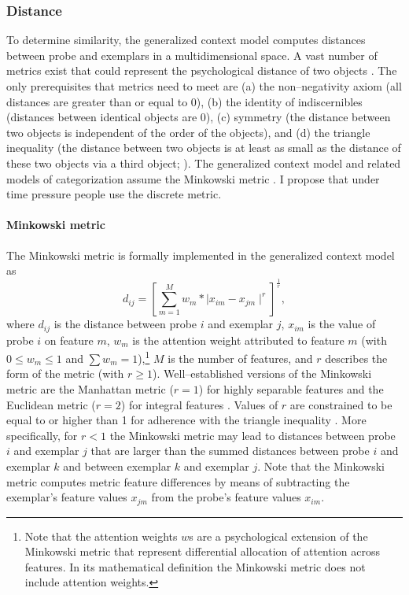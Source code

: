 \documentclass[a4paper,man,natbib]{apa6}
\begin{document}
\subsubsection{Distance}
To determine similarity, the generalized context model computes distances between probe and exemplars in a multidimensional space. A vast number of metrics exist that could represent the psychological distance of two objects \citep{deza2009encyclopedia}. The only prerequisites that metrics need to meet are (a) the non--negativity axiom (all distances are greater than or equal to 0), (b) the identity of indiscernibles (distances between identical objects are 0), (c) symmetry (the distance between two objects is independent of the order of the objects), and (d) the triangle inequality (the distance between two objects is at least as small as the distance of these two objects via a third object; \citealp{restle1959metric}). The generalized context model and related models of categorization assume the Minkowski metric \citep{nosofsky1989further}. I propose that under time pressure people use the discrete metric.

\paragraph{Minkowski metric}
The Minkowski metric is formally implemented in the generalized context model as
\begin{equation}
d_{ij} = \left[\sum\limits_{m=1}^M w_{m}*\mid x_{im} - x_{jm}\mid ^r\right]^\frac{1}{r},
\end{equation}
where $d_{ij}$ is the distance between probe $i$ and exemplar $j$, $x_{im}$ is the value of probe $i$ on feature $m$, $w_{m}$ is the attention weight attributed to feature $m$ (with $0 \leq w_{m} \leq 1$ and $\sum w_{m} = 1$),\footnote{Note that the attention weights $w$s are a psychological extension of the Minkowski metric that represent differential allocation of attention across features. In its mathematical definition the Minkowski metric does not include attention weights.} $M$ is the number of features, and $r$ describes the form of the metric (with $r \geq 1$). Well--established versions of the Minkowski metric are the Manhattan metric ($r = 1$) for highly separable features and the Euclidean metric ($r = 2$) for integral features \citep{shepard1964attention, nosofsky1986attention, garner1974processing}. Values of $r$ are constrained to be equal to or higher than 1 for adherence with the triangle inequality \citep{jakel2008similarity,francois2007concentration,tversky1982similarity,beals1968foundations, kress1989linear}. More specifically, for $r < 1$ the Minkowski metric may lead to distances between probe $i$ and exemplar $j$ that are larger than the summed distances between probe $i$ and exemplar $k$ and between exemplar $k$ and exemplar $j$. Note that the Minkowski metric computes metric feature differences by means of subtracting the exemplar's feature values $x_{jm}$ from the probe's feature values $x_{im}$.
\end{document}
